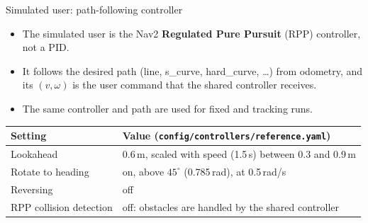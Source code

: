 \documentclass[aspectratio=169,11pt]{beamer}
\begin{document}
\begin{frame}{Simulated user: path-following controller}
  \footnotesize
  \begin{itemize}\setlength{\itemsep}{4pt}
    \item The simulated user is the Nav2 \textbf{Regulated Pure Pursuit} (RPP) controller, not a PID.
    \item It follows the desired path (line, s\_curve, hard\_curve, \dots) from odometry, and its $(v,\omega)$ is the user command that the shared controller receives.
    \item The same controller and path are used for fixed and tracking runs.
  \end{itemize}
  \vspace{0.2cm}
  \scriptsize
  \renewcommand{\arraystretch}{1.1}
  \begin{tabularx}{\textwidth}{@{}L{5.0cm}Y@{}}
    \toprule
    \textbf{Setting} & \textbf{Value} (\texttt{config/controllers/reference.yaml})\\
    \midrule
    Lookahead & 0.6\,m, scaled with speed (1.5\,s) between 0.3 and 0.9\,m\\
    Rotate to heading & on, above $45^\circ$ (0.785\,rad), at 0.5\,rad/s\\
    Reversing & off\\
    RPP collision detection & off: obstacles are handled by the shared controller\\
    \bottomrule
  \end{tabularx}
\end{frame}
\end{document}
